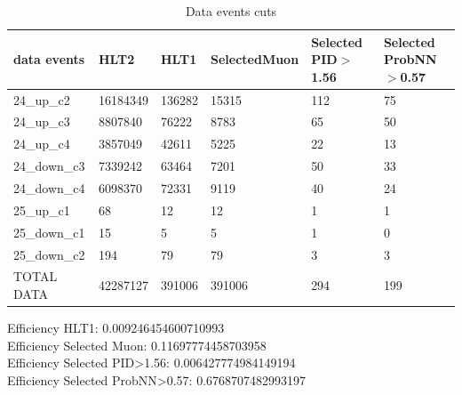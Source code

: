 \documentclass[12pt,a4paper]{article}
\begin{document}
\begin{table}[h]
\centering
\begin{tabular}{llllll}
\hline
 data events         & HLT2     & HLT1    & SelectedMuon & Selected PID$>$1.56  &  Selected ProbNN$>$0.57\\
\hline 
 24\_up\_c2          & 16184349 & 136282  & 15315        & 112   & 75 \\
 24\_up\_c3          & 8807840  & 76222   & 8783         & 65    & 50 \\
 24\_up\_c4          & 3857049  & 42611   & 5225         & 22     & 13\\
 24\_down\_c3        & 7339242  & 63464   & 7201         & 50     & 33\\
 24\_down\_c4        & 6098370  & 72331   & 9119         & 40 & 24\\
 25\_up\_c1          & 68       & 12      & 12           & 1  & 1\\
 25\_down\_c1        & 15       & 5       & 5            & 1  & 0\\
 25\_down\_c2        & 194      & 79      & 79           & 3  & 3\\
 TOTAL DATA          & 42287127 & 391006  & 391006       & 294 & 199\\
\hline 
\end{tabular}
\caption{Data events cuts}
\end{table}

Efficiency HLT1: 0.009246454600710993\\
Efficiency Selected Muon: 0.11697774458703958\\
Efficiency Selected PID>1.56: 0.006427774984149194\\
Efficiency Selected ProbNN>0.57: 0.6768707482993197
\end{document}
